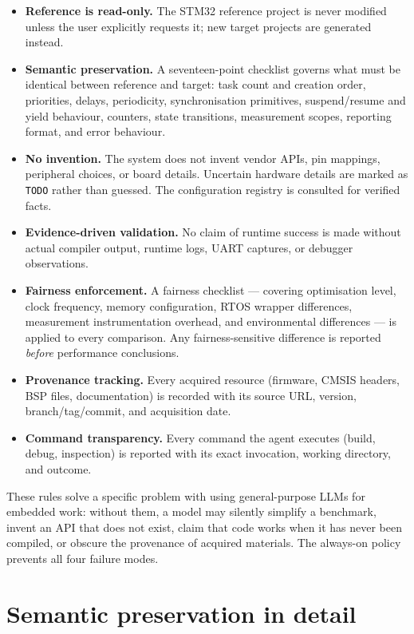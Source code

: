 \begin{itemize}
\item \textbf{Reference is read-only.} The STM32 reference project is never modified
unless the user explicitly requests it; new target projects are generated instead.
\item \textbf{Semantic preservation.} A seventeen-point checklist governs what must be
identical between reference and target: task count and creation order, priorities,
delays, periodicity, synchronisation primitives, suspend/resume and yield behaviour,
counters, state transitions, measurement scopes, reporting format, and error behaviour.
\item \textbf{No invention.} The system does not invent vendor APIs, pin mappings,
peripheral choices, or board details. Uncertain hardware details are marked as
\texttt{TODO} rather than guessed. The configuration registry is consulted for verified
facts.
\item \textbf{Evidence-driven validation.} No claim of runtime success is made without
actual compiler output, runtime logs, UART captures, or debugger observations.
\item \textbf{Fairness enforcement.} A fairness checklist --- covering optimisation level,
clock frequency, memory configuration, RTOS wrapper differences, measurement
instrumentation overhead, and environmental differences --- is applied to every
comparison. Any fairness-sensitive difference is reported \emph{before} performance
conclusions.
\item \textbf{Provenance tracking.} Every acquired resource (firmware, CMSIS headers,
BSP files, documentation) is recorded with its source URL, version, branch/tag/commit,
and acquisition date.
\item \textbf{Command transparency.} Every command the agent executes (build, debug,
inspection) is reported with its exact invocation, working directory, and outcome.
\end{itemize}

These rules solve a specific problem with using general-purpose LLMs for embedded work:
without them, a model may silently simplify a benchmark, invent an API that does not exist,
claim that code works when it has never been compiled, or obscure the provenance of
acquired materials. The always-on policy prevents all four failure modes.

\section{Semantic preservation in detail}
\label{sec:agent-semantics}

